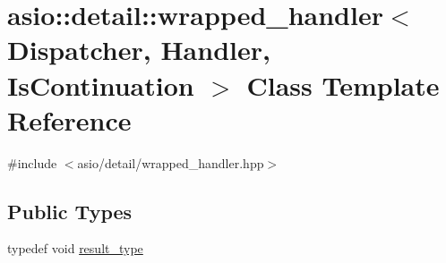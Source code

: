 \hypertarget{classasio_1_1detail_1_1wrapped__handler}{}\section{asio\+:\+:detail\+:\+:wrapped\+\_\+handler$<$ Dispatcher, Handler, Is\+Continuation $>$ Class Template Reference}
\label{classasio_1_1detail_1_1wrapped__handler}


{\ttfamily \#include $<$asio/detail/wrapped\+\_\+handler.\+hpp$>$}

\subsection*{Public Types}
\begin{DoxyCompactItemize}
\item 
typedef void \hyperlink{classasio_1_1detail_1_1wrapped__handler_ac7edc27224485b7087df71db0e1c952a}{result\+\_\+type}
\end{DoxyCompactItemize}
